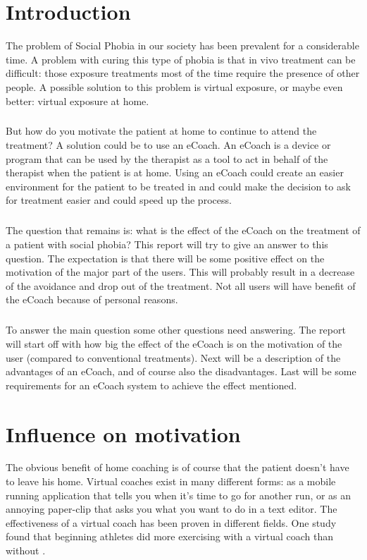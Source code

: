 \documentclass[english,a4paper,pdftex]{report}
\begin{document}

\newpage
\tableofcontents

\chapter{Introduction}
The problem of Social Phobia in our society has been prevalent for a considerable time. A problem with curing this type of phobia is that in vivo treatment can be difficult: those exposure treatments most of the time require the presence of other people. A possible solution to this problem is virtual exposure, or maybe even better: virtual exposure at home.
\paragraph{}
But how do you motivate the patient at home to continue to attend the treatment? A solution could be to use an eCoach. An eCoach is a device or program that can be used by the therapist as a tool to act in behalf of the therapist when the patient is at home. Using an eCoach could create an easier environment for the patient to be treated in and could make the decision to ask for treatment easier and could speed up the process.
\paragraph{}
The question that remains is: what is the effect of the eCoach on the treatment of a patient with social phobia? This report will try to give an answer to this question. The expectation is that there will be some positive effect on the motivation of the major part of the users. This will probably result in a decrease of the avoidance and drop out of the treatment. Not all users will have benefit of the eCoach because of personal reasons.
\paragraph{}
To answer the main question some other questions need answering. The report will start off with how big the effect of the eCoach is on the motivation of the user (compared to conventional treatments). Next will be a description of the advantages of an eCoach, and of course also the disadvantages. Last will be some requirements for an eCoach system to achieve the effect mentioned.




\chapter{Influence on motivation}
The obvious benefit of home coaching is of course that the patient doesn't have to leave his home. Virtual coaches exist in many different forms: as a mobile running application that tells you when it's time to go for another run, or as an annoying paper-clip that asks you what you want to do in a text editor.  The effectiveness of a virtual coach has been proven in different fields. One study found that beginning athletes did more exercising with a virtual coach than without \cite{eyck2006effect}. 
\end{document}
